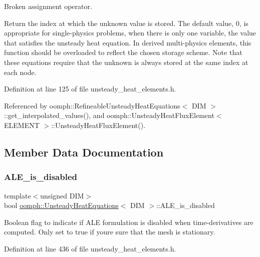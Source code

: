 Broken assignment operator. 

Return the index at which the unknown value is stored. The default value, 0, is appropriate for single-\/physics problems, when there is only one variable, the value that satisfies the unsteady heat equation. In derived multi-\/physics elements, this function should be overloaded to reflect the chosen storage scheme. Note that these equations require that the unknown is always stored at the same index at each node. 

Definition at line 125 of file unsteady\+\_\+heat\+\_\+elements.\+h.



Referenced by oomph\+::\+Refineable\+Unsteady\+Heat\+Equations$<$ D\+I\+M $>$\+::get\+\_\+interpolated\+\_\+values(), and oomph\+::\+Unsteady\+Heat\+Flux\+Element$<$ E\+L\+E\+M\+E\+N\+T $>$\+::\+Unsteady\+Heat\+Flux\+Element().



\subsection{Member Data Documentation}
\mbox{\label{classoomph_1_1UnsteadyHeatEquations_ad0573a152afa50ce714835b5551fc38c}} 
\subsubsection{\texorpdfstring{A\+L\+E\+\_\+is\+\_\+disabled}{ALE\_is\_disabled}}
{\footnotesize\ttfamily template$<$unsigned D\+IM$>$ \\
bool \hyperlink{classoomph_1_1UnsteadyHeatEquations}{oomph\+::\+Unsteady\+Heat\+Equations}$<$ D\+IM $>$\+::A\+L\+E\+\_\+is\+\_\+disabled\hspace{0.3cm}{\ttfamily [protected]}}



Boolean flag to indicate if A\+LE formulation is disabled when time-\/derivatives are computed. Only set to true if you\textquotesingle{}re sure that the mesh is stationary. 



Definition at line 436 of file unsteady\+\_\+heat\+\_\+elements.\+h.



